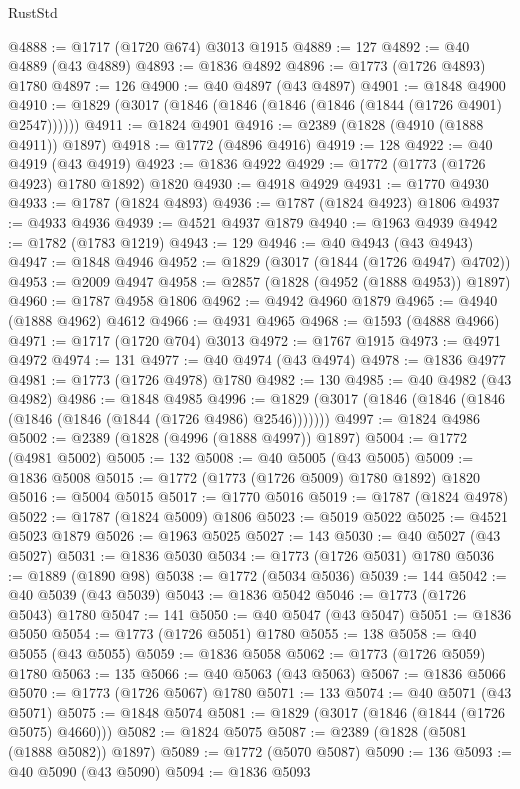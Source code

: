 \begin{lexlean}{RustStd}
\begin{coremodule}
@4888 := @1717 (@1720 @674) @3013 @1915
@4889 := 127
@4892 := @40 @4889 (@43 @4889)
@4893 := @1836 @4892
@4896 := @1773 (@1726 @4893) @1780
@4897 := 126
@4900 := @40 @4897 (@43 @4897)
@4901 := @1848 @4900
@4910 := @1829 (@3017 (@1846 (@1846 (@1846 (@1846 (@1844 (@1726 @4901) @2547))))))
@4911 := @1824 @4901
@4916 := @2389 (@1828 (@4910 (@1888 @4911)) @1897)
@4918 := @1772 (@4896 @4916)
@4919 := 128
@4922 := @40 @4919 (@43 @4919)
@4923 := @1836 @4922
@4929 := @1772 (@1773 (@1726 @4923) @1780 @1892) @1820
@4930 := @4918 @4929
@4931 := @1770 @4930
@4933 := @1787 (@1824 @4893)
@4936 := @1787 (@1824 @4923) @1806
@4937 := @4933 @4936
@4939 := @4521 @4937 @1879
@4940 := @1963 @4939
@4942 := @1782 (@1783 @1219)
@4943 := 129
@4946 := @40 @4943 (@43 @4943)
@4947 := @1848 @4946
@4952 := @1829 (@3017 (@1844 (@1726 @4947) @4702))
@4953 := @2009 @4947
@4958 := @2857 (@1828 (@4952 (@1888 @4953)) @1897)
@4960 := @1787 @4958 @1806
@4962 := @4942 @4960 @1879
@4965 := @4940 (@1888 @4962) @4612
@4966 := @4931 @4965
@4968 := @1593 (@4888 @4966)
@4971 := @1717 (@1720 @704) @3013
@4972 := @1767 @1915
@4973 := @4971 @4972
@4974 := 131
@4977 := @40 @4974 (@43 @4974)
@4978 := @1836 @4977
@4981 := @1773 (@1726 @4978) @1780
@4982 := 130
@4985 := @40 @4982 (@43 @4982)
@4986 := @1848 @4985
@4996 := @1829 (@3017 (@1846 (@1846 (@1846 (@1846 (@1846 (@1844 (@1726 @4986) @2546)))))))
@4997 := @1824 @4986
@5002 := @2389 (@1828 (@4996 (@1888 @4997)) @1897)
@5004 := @1772 (@4981 @5002)
@5005 := 132
@5008 := @40 @5005 (@43 @5005)
@5009 := @1836 @5008
@5015 := @1772 (@1773 (@1726 @5009) @1780 @1892) @1820
@5016 := @5004 @5015
@5017 := @1770 @5016
@5019 := @1787 (@1824 @4978)
@5022 := @1787 (@1824 @5009) @1806
@5023 := @5019 @5022
@5025 := @4521 @5023 @1879
@5026 := @1963 @5025
@5027 := 143
@5030 := @40 @5027 (@43 @5027)
@5031 := @1836 @5030
@5034 := @1773 (@1726 @5031) @1780
@5036 := @1889 (@1890 @98)
@5038 := @1772 (@5034 @5036)
@5039 := 144
@5042 := @40 @5039 (@43 @5039)
@5043 := @1836 @5042
@5046 := @1773 (@1726 @5043) @1780
@5047 := 141
@5050 := @40 @5047 (@43 @5047)
@5051 := @1836 @5050
@5054 := @1773 (@1726 @5051) @1780
@5055 := 138
@5058 := @40 @5055 (@43 @5055)
@5059 := @1836 @5058
@5062 := @1773 (@1726 @5059) @1780
@5063 := 135
@5066 := @40 @5063 (@43 @5063)
@5067 := @1836 @5066
@5070 := @1773 (@1726 @5067) @1780
@5071 := 133
@5074 := @40 @5071 (@43 @5071)
@5075 := @1848 @5074
@5081 := @1829 (@3017 (@1846 (@1844 (@1726 @5075) @4660)))
@5082 := @1824 @5075
@5087 := @2389 (@1828 (@5081 (@1888 @5082)) @1897)
@5089 := @1772 (@5070 @5087)
@5090 := 136
@5093 := @40 @5090 (@43 @5090)
@5094 := @1836 @5093

\end{coremodule}
\end{lexlean}
